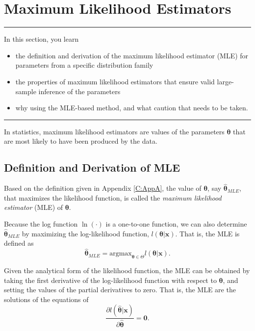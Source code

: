 \documentclass[]{book}
\providecommand{\tightlist}{%
  \setlength{\itemsep}{0pt}\setlength{\parskip}{0pt}}
\theoremstyle{definition}
\theoremstyle{definition}
\theoremstyle{definition}
\theoremstyle{remark}
\begin{document}
\section{Maximum Likelihood Estimators}\label{S:AppC:MLE}

\begin{center}\rule{0.5\linewidth}{\linethickness}\end{center}

In this section, you learn

\begin{itemize}
\tightlist
\item
  the definition and derivation of the maximum likelihood estimator
  (MLE) for parameters from a specific distribution family
\item
  the properties of maximum likelihood estimators that ensure valid
  large-sample inference of the parameters
\item
  why using the MLE-based method, and what caution that needs to be
  taken.
\end{itemize}

\begin{center}\rule{0.5\linewidth}{\linethickness}\end{center}

In statistics, maximum likelihood estimators are values of the
parameters \(\boldsymbol \theta\) that are most likely to have been
produced by the data.

\subsection{Definition and Derivation of
MLE}\label{definition-and-derivation-of-mle}

Based on the definition given in Appendix \ref{C:AppA}, the value of
\(\boldsymbol \theta\), say \(\hat{\boldsymbol \theta}_{MLE}\), that
maximizes the likelihood function, is called the \emph{maximum
likelihood estimator} (MLE) of \(\boldsymbol \theta\).

Because the log function \(\ln(\cdot)\) is a one-to-one function, we can
also determine \(\hat{\boldsymbol{\theta}}_{MLE}\) by maximizing the
log-likelihood function, \(l(\boldsymbol \theta|\mathbf{x})\). That is,
the MLE is defined as
\[\hat{\boldsymbol \theta}_{MLE}={\mbox{argmax}}_{\boldsymbol{\theta}\in\Theta}l(\boldsymbol{\theta}|\mathbf{x}).\]

Given the analytical form of the likelihood function, the MLE can be
obtained by taking the first derivative of the log-likelihood function
with respect to \(\boldsymbol{\theta}\), and setting the values of the
partial derivatives to zero. That is, the MLE are the solutions of the
equations of
\[\frac{\partial l(\hat{\boldsymbol{\theta}}|\mathbf{x})}{\partial\hat{\boldsymbol{\theta}}}=\mathbf 0.\]
\end{document}
